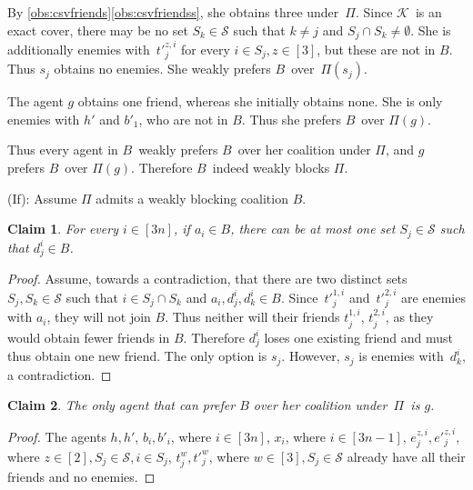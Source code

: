 \documentclass[a4paper,fleqn]{cas-sc}
\newcommand{\partition}{\ensuremath{\Pi}\xspace}
\newcommand{\blockingCoalition}{\ensuremath{B}\xspace}
\newtheorem{claim}{Claim}
\newcommand{\sets}{\ensuremath{\mathcal{S}}}
\newcommand{\elements}{\ensuremath{[3n]}}
\newcommand{\sset}[1]{\ensuremath{S_{#1}}}
\newcommand{\ecov}{\ensuremath{\mathcal{K}}}
\begin{document}
{\begin{compactitem}
By \cref{obs:csvfriends}\eqref{obs:csvfriendss}, she obtains three under~\partition. 
Since \ecov\ is an exact cover, there may be no set $\sset k \in \sets$ such that $k \neq j$ and $\sset j \cap \sset k \neq \emptyset$.
She is additionally enemies with~$t'^{z,i}_j$ for every $i \in \sset j, z \in [3]$, but these are not in \blockingCoalition.
Thus $s_j$ obtains no enemies.
She weakly prefers \blockingCoalition\ over~$\partition(s_j)$.
\item The agent $g$ obtains one friend, whereas she initially obtains none. She is only enemies with $h'$ and $b'_1$, who are not in \blockingCoalition.
Thus she prefers \blockingCoalition\ over $\partition(g)$.
\end{compactitem}
Thus every agent in \blockingCoalition\ weakly prefers \blockingCoalition\ over her coalition under \partition, and $g$ prefers \blockingCoalition\ over $\partition(g)$.
Therefore \blockingCoalition\ indeed weakly blocks \partition.

(If): Assume $\partition$ admits a weakly blocking coalition \blockingCoalition. 

\begin{claim}\label{clm:scv_exactcov}
For every $i \in \elements$, if $a_i \in \blockingCoalition$, there can be at most one set $\sset j \in \sets$ such that $d^i_j \in \blockingCoalition$.
\end{claim}
\begin{proof}\renewcommand{\qedsymbol}{$\diamond$}
Assume, towards a contradiction, that there are two distinct sets $\sset j, \sset k \in \sets$ such that $i \in \sset j \cap \sset k$ and $a_i, d^i_j, d^i_k \in \blockingCoalition$.
Since~$t'^{1,i}_j$ and~$t'^{2,i}_j$ are enemies with $a_i$, they will not join \blockingCoalition. Thus neither will their friends $t^{1,i}_j$, $t^{2,i}_j$, as they would obtain fewer friends in \blockingCoalition.
Therefore $d^i_j$ loses one existing friend and must thus obtain one new friend. The only option is $s_j$. However, $s_j$ is enemies with~$d^i_k$, a contradiction.
\end{proof}

\begin{claim}\label{obs:csvcantimpr}
The only agent that can prefer $\blockingCoalition$ over her coalition under~\partition\ is $g$.
\end{claim}

\begin{proof}\renewcommand{\qedsymbol}{$\diamond$}
The agents $h, h'$, $b_i, b'_i$, where $i \in \elements$, $x_i$, where $i \in [3n - 1]$, $e^{z,i}_j, e'^{z,i}_j$, where $z \in [2], \sset j \in \sets, i \in \sset j$, $t^w_j, t'^w_j$, where $w \in [3], \sset j \in \sets$ already have all their friends and no enemies.


\end{proof}}
\end{document}
